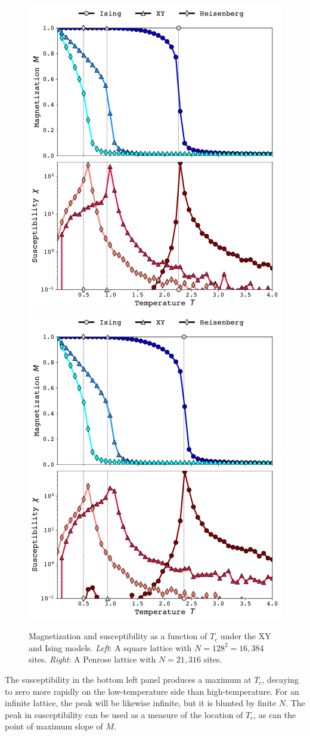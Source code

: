 \documentclass[
  amsmath,
  amssymb,
  aps,
  twocolumn,
  nofootinbib,
  floatfix,
]{revtex4-2}
\begin{document}
\begin{figure}
  \centering
  \includegraphics[width=0.49\linewidth]{../figs/square.pdf}\hfill
  \includegraphics[width=0.49\linewidth]{../figs/penrose.pdf}
  \caption{Magnetization and susceptibility as a function of $T_c$ under the XY and Ising models. \textit{Left}: A square lattice with $N=128^2=16,384$ sites. \textit{Right}: A Penrose lattice with $N=21,316$ sites.}
  \label{fig:square}
\end{figure}

The susceptibility in the bottom left panel produces a maximum at $T_c$, decaying to zero more rapidly on the low-temperature side than high-temperature. For an infinite lattice, the peak will be likewise infinite, but it is blunted by finite $N$. The peak in susceptibility can be used as a measure of the location of $T_c$, as can the point of maximum slope of $M$.
\end{document}
